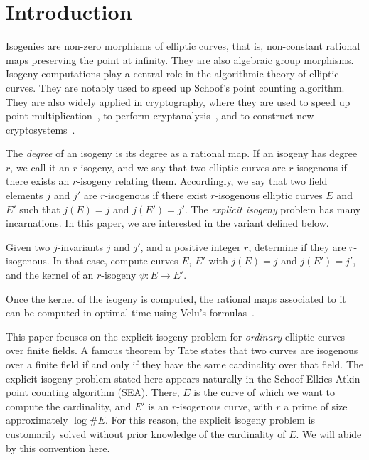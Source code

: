 \documentclass{lms}
\makeatletter
\newenvironment{localblock}[1]{\@exmplstar{\relax}{#1}}{\@endexample}
\makeatother
\begin{document}

\section{Introduction}
\label{sec:introduction}

Isogenies are non-zero morphisms of elliptic curves, that is,
non-constant rational maps preserving the point at infinity. They are
also algebraic group morphisms. Isogeny computations play a central
role in the algorithmic theory of elliptic curves. They are notably
used to speed up Schoof's point counting
algorithm\cite{schoof85,atkin88,elkies92,schoof95,elkies98}. They are
also widely applied in cryptography, where they are used to speed up
point multiplication~\cite{gallant+lambert+vanstone01,birkner+sica11},
to perform cryptanalysis~\cite{mauer+menezes+teske01}, and to
construct new
cryptosystems~\cite{teske06,charles+lauter+goren09,Stol,defeo+jao+plut12,jao+soukharev2014-signatures}.

The \emph{degree} of an isogeny is its degree as a rational map. If an
isogeny has degree $r$, we call it an $r$-isogeny, and we say that two
elliptic curves are $r$-isogenous if there exists an $r$-isogeny
relating them. Accordingly, we say that two field elements $j$ and
$j'$ are $r$-isogenous if there exist $r$-isogenous elliptic curves
$E$ and $E'$ such that $j(E)=j$ and $j(E')=j'$. The
\emph{explicit isogeny} problem has many incarnations. In this paper,
we are interested in the variant defined below.

\begin{localblock}{Explicit isogeny problem} \label{prob:isogeny-problem}
  Given two $j$-invariants $j$ and $j'$, and a positive integer
  $r$, determine if they are $r$-isogenous. In that case, compute
  curves $E$, $E'$ with $j(E)=j$ and $j(E')=j'$, and the
  kernel of an $r$-isogeny $ψ:E\to E'$.
\end{localblock}

Once the kernel of the isogeny is computed, the rational maps
associated to it can be computed in optimal time using Velu's
formulas~\cite{velu71}.

This paper focuses on the explicit isogeny problem for \emph{ordinary}
elliptic curves over finite fields. A famous theorem by Tate states
that two curves are isogenous over a finite field if and only if they
have the same cardinality over that field. The explicit isogeny
problem stated here appears naturally in the Schoof-Elkies-Atkin point
counting algorithm (SEA). There, $E$ is the curve of which we want to
compute the cardinality, and $E'$ is an $r$-isogenous curve, with $r$
a prime of size approximately $\log\#E$. For this reason, the explicit
isogeny problem is customarily solved without prior knowledge of the
cardinality of $E$. We will abide by this convention here.
\end{document}
